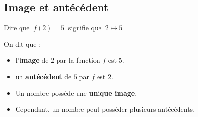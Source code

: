 \subsection{Image et antécédent}

\begin{ex}
	Dire que $~f(2)=5~$ signifie que $~2\mapsto 5$

	On dit que :
	\begin{itemize}
		\item l'\textbf{image} de $2$ par la fonction $f$ est $5$.
		\item un \textbf{antécédent} de $5$ par $f$ est $2$.
	\end{itemize}
\end{ex}

\begin{rem}
	\nline
	\begin{itemize}
		\item Un nombre possède une \textbf{unique image}.
		\item Cependant, un nombre peut posséder plusieurs antécédents.
	\end{itemize}
\end{rem}


